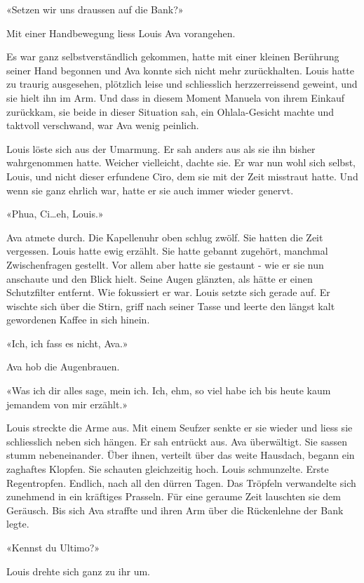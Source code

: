 «Setzen wir uns draussen auf die Bank?»

Mit einer Handbewegung liess Louis Ava vorangehen.

\sectionbreak

Es war ganz selbstverständlich gekommen, hatte mit einer
kleinen Berührung seiner Hand begonnen und Ava konnte sich nicht mehr
zurückhalten. Louis hatte zu traurig ausgesehen, plötzlich leise und schliesslich herzzerreissend geweint, und sie hielt ihn im Arm. 
Und dass in diesem Moment Manuela von ihrem Einkauf
zurückkam, sie beide in dieser Situation sah, ein Ohlala-Gesicht machte
und taktvoll verschwand, war Ava wenig peinlich.

Louis löste sich aus der Umarmung. Er sah anders aus als sie ihn bisher
wahrgenommen hatte. Weicher vielleicht, dachte sie. Er war
nun wohl sich selbst, Louis, und nicht dieser erfundene Ciro, dem sie
mit der Zeit misstraut hatte. Und wenn sie ganz ehrlich war, hatte er
sie auch immer wieder genervt.

«Phua, Ci…eh, Louis.»

Ava atmete durch. Die Kapellenuhr oben schlug zwölf. Sie hatten die Zeit
vergessen. Louis hatte ewig erzählt. Sie hatte gebannt zugehört,
manchmal Zwischenfragen gestellt. Vor allem aber hatte sie gestaunt - 
wie er sie nun anschaute und den Blick hielt. Seine Augen glänzten, als hätte er einen Schutzfilter entfernt. 
Wie fokussiert er war. Louis setzte sich gerade auf. Er wischte sich über die Stirn, griff nach
seiner Tasse und leerte den längst kalt gewordenen Kaffee in sich
hinein.

«Ich, ich fass es nicht, Ava.»

Ava hob die Augenbrauen.

«Was ich dir alles sage, mein ich. Ich, ehm, so viel habe ich bis heute
kaum jemandem von mir erzählt.»

Louis streckte die Arme aus. Mit einem Seufzer senkte er sie wieder und liess sie schliesslich neben sich hängen. Er sah entrückt aus. Ava überwältigt. Sie sassen stumm nebeneinander.
Über ihnen, verteilt über das weite Hausdach, begann ein zaghaftes
Klopfen. Sie schauten gleichzeitig hoch. Louis schmunzelte. Erste
Regentropfen. Endlich, nach all den dürren Tagen. Das Tröpfeln verwandelte sich zunehmend in ein kräftiges Prasseln.
Für eine geraume Zeit lauschten sie dem Geräusch. Bis sich Ava straffte und ihren Arm über die Rückenlehne der Bank legte.

«Kennst du Ultimo?»

Louis drehte sich ganz zu ihr um.

